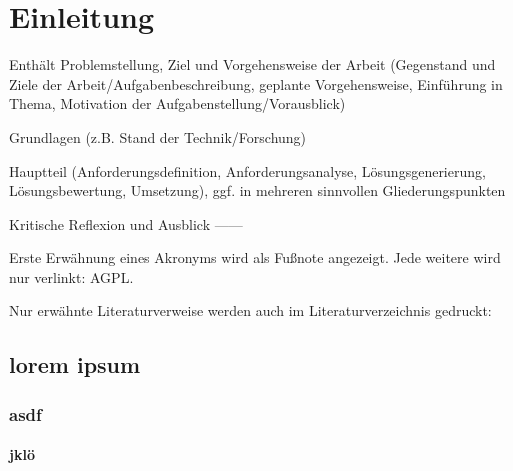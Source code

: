 
\chapter{Einleitung}
Enthält Problemstellung, Ziel und Vorgehensweise der Arbeit (Gegenstand und Ziele der Arbeit/Aufgabenbeschreibung,
geplante Vorgehensweise, Einführung in Thema, Motivation der Aufgabenstellung/Vorausblick)

Grundlagen (z.B. Stand der Technik/Forschung)

Hauptteil (Anforderungsdefinition, Anforderungsanalyse, Lösungsgenerierung, Lösungsbewertung, Umsetzung),
ggf. in mehreren sinnvollen Gliederungspunkten

Kritische Reflexion und Ausblick
------

Erste Erwähnung eines Akronyms wird als Fußnote angezeigt. Jede weitere wird
nur verlinkt: \acf{AGPL}. \cite{appleDesignGuide, appleMfiProgram}

Nur erwähnte Literaturverweise werden auch im Literaturverzeichnis gedruckt:
\cites[150--130]{siliconBLE}[S.~150f.]{hornppm}

\lipsum[1]

\section{lorem ipsum}

\subsection{asdf}
\subsubsection{jklö}